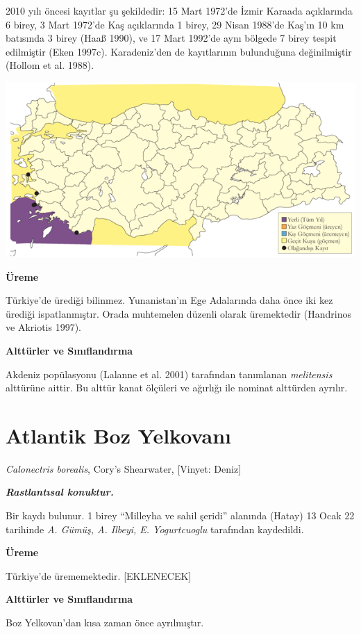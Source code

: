 \documentclass[
  letterpaper,
  DIV=11,
  numbers=noendperiod]{scrreprt}
\begin{document}
2010 yılı öncesi kayıtlar şu şekildedir: 15 Mart 1972'de İzmir Karaada
açıklarında 6 birey, 3 Mart 1972'de Kaş açıklarında 1 birey, 29 Nisan
1988'de Kaş'ın 10 km batısında 3 birey (Haaß 1990), ve 17 Mart 1992'de
aynı bölgede 7 birey tespit edilmiştir (Eken 1997c). Karadeniz'den de
kayıtlarının bulunduğuna değinilmiştir (Hollom et al. 1988).

\includegraphics{images/harita_Page_050.png}

\textbf{Üreme}

Türkiye'de ürediği bilinmez. Yunanistan'ın Ege Adalarında daha önce iki
kez ürediği ispatlanmıştır. Orada muhtemelen düzenli olarak üremektedir
(Handrinos ve Akriotis 1997).

\textbf{Alttürler ve Sınıflandırma}

Akdeniz popülasyonu (Lalanne et al. 2001) tarafından tanımlanan
\emph{melitensis} alttürüne aittir. Bu alttür kanat ölçüleri ve ağırlığı
ile nominat alttürden ayrılır.

\section{Atlantik Boz Yelkovanı}\label{atlantik-boz-yelkovanux131}

\emph{Calonectris borealis}, Cory's Shearwater, {[}Vinyet: Deniz{]}

\textbf{\emph{Rastlantısal konuktur.}}

Bir kaydı bulunur. 1 birey ``Milleyha ve sahil şeridi'' alanında (Hatay)
13 Ocak 22 tarihinde \emph{A. Gümüş, A. Ilbeyi, E. Yogurtcuoglu}
tarafından kaydedildi.

\textbf{Üreme}

Türkiye'de ürememektedir. {[}EKLENECEK{]}

\textbf{Alttürler ve Sınıflandırma}

Boz Yelkovan'dan kısa zaman önce ayrılmıştır.
\end{document}
